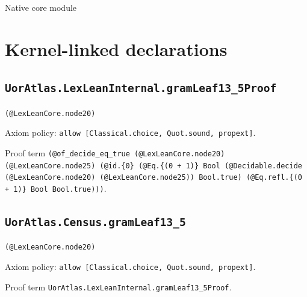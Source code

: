 \documentclass[11pt]{article}
\begin{document}
\begin{center}{\LARGE Native core module}\end{center}
\section*{Kernel-linked declarations}
\subsection*{\texttt{UorAtlas.LexLeanInternal.gramLeaf13\_5Proof}}
\noindent\texttt{(@LexLeanCore.node20)}\par
\noindent Axiom policy: \texttt{allow [Classical.choice, Quot.sound, propext]}.\par
\noindent Proof term \texttt{(@of\_decide\_eq\_true (@LexLeanCore.node20) (@LexLeanCore.node25) (@id.\{0\} (@Eq.\{(0 + 1)\} Bool (@Decidable.decide (@LexLeanCore.node20) (@LexLeanCore.node25)) Bool.true) (@Eq.refl.\{(0 + 1)\} Bool Bool.true)))}.\par
\subsection*{\texttt{UorAtlas.Census.gramLeaf13\_5}}
\noindent\texttt{(@LexLeanCore.node20)}\par
\noindent Axiom policy: \texttt{allow [Classical.choice, Quot.sound, propext]}.\par
\noindent Proof term \texttt{UorAtlas.LexLeanInternal.gramLeaf13\_5Proof}.\par
\end{document}

